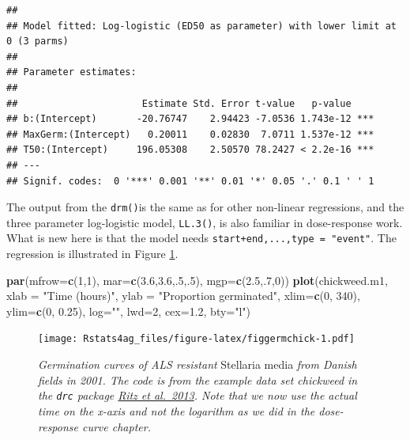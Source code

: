 \documentclass[letterpaper,]{book}
\newenvironment{Shaded}{\begin{snugshade}}{\end{snugshade}}
\newcommand{\DataTypeTok}[1]{\textcolor[rgb]{0.13,0.29,0.53}{#1}}
\newcommand{\DecValTok}[1]{\textcolor[rgb]{0.00,0.00,0.81}{#1}}
\newcommand{\FloatTok}[1]{\textcolor[rgb]{0.00,0.00,0.81}{#1}}
\newcommand{\KeywordTok}[1]{\textcolor[rgb]{0.13,0.29,0.53}{\textbf{#1}}}
\newcommand{\NormalTok}[1]{#1}
\newcommand{\StringTok}[1]{\textcolor[rgb]{0.31,0.60,0.02}{#1}}
\begin{document}
\begin{verbatim}
## 
## Model fitted: Log-logistic (ED50 as parameter) with lower limit at 0 (3 parms)
## 
## Parameter estimates:
## 
##                      Estimate Std. Error t-value   p-value    
## b:(Intercept)       -20.76747    2.94423 -7.0536 1.743e-12 ***
## MaxGerm:(Intercept)   0.20011    0.02830  7.0711 1.537e-12 ***
## T50:(Intercept)     196.05308    2.50570 78.2427 < 2.2e-16 ***
## ---
## Signif. codes:  0 '***' 0.001 '**' 0.01 '*' 0.05 '.' 0.1 ' ' 1
\end{verbatim}

The output from the \texttt{drm()}is the same as for other non-linear regressions, and the three parameter log-logistic model, \texttt{LL.3()}, is also familiar in dose-response work. What is new here is that the model needs \texttt{start+end,...,type\ =\ "event"}. The regression is illustrated in Figure \ref{fig:figgermchick}.



\begin{Shaded}
\begin{Highlighting}[]
\KeywordTok{par}\NormalTok{(}\DataTypeTok{mfrow=}\KeywordTok{c}\NormalTok{(}\DecValTok{1}\NormalTok{,}\DecValTok{1}\NormalTok{), }\DataTypeTok{mar=}\KeywordTok{c}\NormalTok{(}\FloatTok{3.6}\NormalTok{,}\FloatTok{3.6}\NormalTok{,.}\DecValTok{5}\NormalTok{,.}\DecValTok{5}\NormalTok{), }\DataTypeTok{mgp=}\KeywordTok{c}\NormalTok{(}\FloatTok{2.5}\NormalTok{,.}\DecValTok{7}\NormalTok{,}\DecValTok{0}\NormalTok{))}
\KeywordTok{plot}\NormalTok{(chickweed.m1, }\DataTypeTok{xlab =} \StringTok{"Time (hours)"}\NormalTok{, }\DataTypeTok{ylab =} \StringTok{"Proportion germinated"}\NormalTok{, }
     \DataTypeTok{xlim=}\KeywordTok{c}\NormalTok{(}\DecValTok{0}\NormalTok{, }\DecValTok{340}\NormalTok{), }\DataTypeTok{ylim=}\KeywordTok{c}\NormalTok{(}\DecValTok{0}\NormalTok{, }\FloatTok{0.25}\NormalTok{), }\DataTypeTok{log=}\StringTok{""}\NormalTok{, }\DataTypeTok{lwd=}\DecValTok{2}\NormalTok{, }\DataTypeTok{cex=}\FloatTok{1.2}\NormalTok{, }\DataTypeTok{bty=}\StringTok{"l"}\NormalTok{)  }
\end{Highlighting}
\end{Shaded}

\begin{figure}
\centering
\texttt{[image: Rstats4ag\_files/figure-latex/figgermchick-1.pdf]}
\caption{\label{fig:figgermchick}\emph{Germination curves of ALS resistant} Stellaria media \emph{from Danish fields in 2001. The code is from the example data set chickweed in the \texttt{drc} package \href{http://www.sciencedirect.com/science/article/pii/S1161030112001360}{Ritz et al.~2013}. Note that we now use the actual time on the x-axis and not the logarithm as we did in the dose-response curve chapter.}}
\end{figure}
\end{document}
